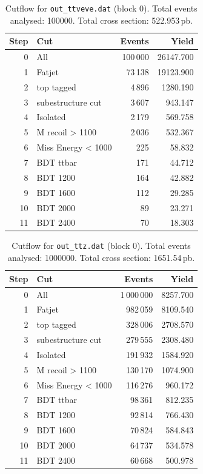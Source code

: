 \documentclass{article}
\begin{document}
\begin{table}[H]
\centering
\begin{tabular}{r l r r}
\toprule
Step & Cut & Events & Yield \\
\midrule
0 & All & 100\,000 & 26147.700 \\
1 & Fatjet & 73\,138 & 19123.900 \\
2 & top tagged & 4\,896 & 1280.190 \\
3 & subestructure cut & 3\,607 & 943.147 \\
4 & Isolated & 2\,179 & 569.758 \\
5 & M recoil > 1100 & 2\,036 & 532.367 \\
6 & Miss Energy < 1000 & 225 & 58.832 \\
7 & BDT ttbar & 171 & 44.712 \\
8 & BDT 1200 & 164 & 42.882 \\
9 & BDT 1600 & 112 & 29.285 \\
10 & BDT 2000 & 89 & 23.271 \\
11 & BDT 2400 & 70 & 18.303 \\
\bottomrule
\end{tabular}
\caption{Cutflow for \texttt{out\_ttveve.dat} (block 0). Total events analysed: 100000. Total cross section: 522.953\,pb.}
\label{tab:cutflow-out-ttveve-dat}
\end{table}

\begin{table}[H]
\centering
\begin{tabular}{r l r r}
\toprule
Step & Cut & Events & Yield \\
\midrule
0 & All & 1\,000\,000 & 8257.700 \\
1 & Fatjet & 982\,059 & 8109.540 \\
2 & top tagged & 328\,006 & 2708.570 \\
3 & subestructure cut & 279\,555 & 2308.480 \\
4 & Isolated & 191\,932 & 1584.920 \\
5 & M recoil > 1100 & 130\,170 & 1074.900 \\
6 & Miss Energy < 1000 & 116\,276 & 960.172 \\
7 & BDT ttbar & 98\,361 & 812.235 \\
8 & BDT 1200 & 92\,814 & 766.430 \\
9 & BDT 1600 & 70\,824 & 584.843 \\
10 & BDT 2000 & 64\,737 & 534.578 \\
11 & BDT 2400 & 60\,668 & 500.978 \\
\bottomrule
\end{tabular}
\caption{Cutflow for \texttt{out\_ttz.dat} (block 0). Total events analysed: 1000000. Total cross section: 1651.54\,pb.}
\label{tab:cutflow-out-ttz-dat}
\end{table}
\end{document}
